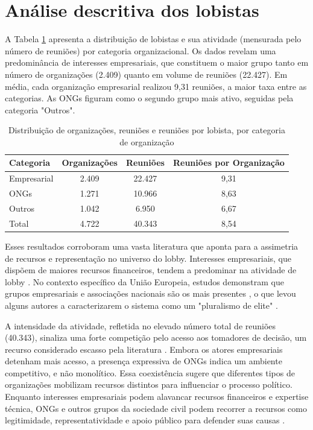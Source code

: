 \section{Análise descritiva dos lobistas}
\label{sec:resultados_descritica_lobistas}
A Tabela \ref{tab:dist_orgs_reunioes} apresenta a distribuição de lobistas e sua atividade (mensurada pelo número de reuniões) por categoria organizacional. Os dados revelam uma predominância de interesses empresariais, que constituem o maior grupo tanto em número de organizações (2.409) quanto em volume de reuniões (22.427). Em média, cada organização empresarial realizou 9,31 reuniões, a maior taxa entre as categorias. As ONGs figuram como o segundo grupo mais ativo, seguidas pela categoria "Outros".

\begin{table}[!htbp]
\centering
\caption{Distribuição de organizações, reuniões e reuniões por lobista, por categoria de organização}
\label{tab:dist_orgs_reunioes}
\begin{tabular}{lccc}
\hline
Categoria & Organizações & Reuniões & Reuniões por Organização \\
\hline
Empresarial & 2.409 & 22.427 & 9,31 \\
ONGs & 1.271 & 10.966 & 8,63 \\
Outros & 1.042 & 6.950 & 6,67 \\
\hline
Total & 4.722 & 40.343 & 8,54 \\
\hline  
\end{tabular}
\end{table}

Esses resultados corroboram uma vasta literatura que aponta para a assimetria de recursos e representação no universo do lobby. Interesses empresariais, que dispõem de maiores recursos financeiros, tendem a predominar na atividade de lobby \cite{de_figueiredo_advancing_2014}. No contexto específico da União Europeia, estudos demonstram que grupos empresariais e associações nacionais são os mais presentes \cite{dur20212wholobbies, eising2007institutional}, o que levou alguns autores a caracterizarem o sistema como um "pluralismo de elite" \cite{coen1997evolution, schmidt2006procedural}.

A intensidade da atividade, refletida no elevado número total de reuniões (40.343), sinaliza uma forte competição pelo acesso aos tomadores de decisão, um recurso considerado escasso pela literatura \cite{hall1990buying}. Embora os atores empresariais detenham mais acesso, a presença expressiva de ONGs indica um ambiente competitivo, e não monolítico. Essa coexistência sugere que diferentes tipos de organizações mobilizam recursos distintos para influenciar o processo político. Enquanto interesses empresariais podem alavancar recursos financeiros e expertise técnica, ONGs e outros grupos da sociedade civil podem recorrer a recursos como legitimidade, representatividade e apoio público para defender suas causas \cite{Coen2019, dur_measuring_2008}.

